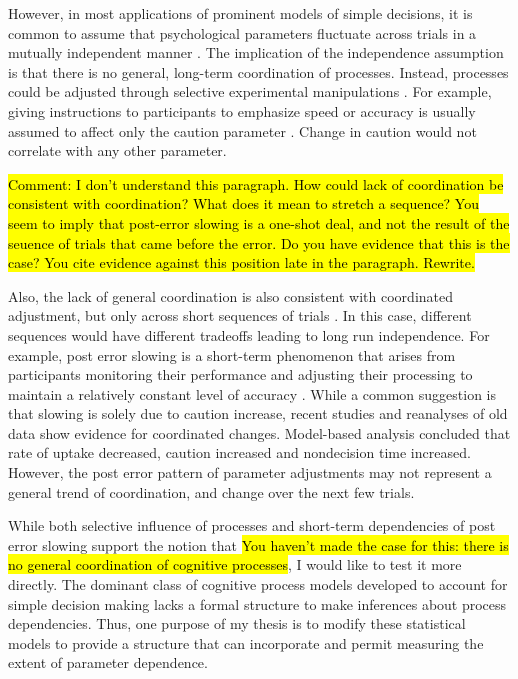 \documentclass[12pt]{article}
\newcommand{\trish}[1]{\textrm{\hl{#1}}}
\begin{document}
However, in most applications of prominent models of simple
decisions, it is common to assume that psychological parameters fluctuate
across trials in a mutually independent manner
\citep{RatTue2002,UshMcc2001,BroHea2008}. The implication of the
independence assumption is that there is no general, long-term coordination
of processes. Instead, processes could be adjusted  through selective experimental manipulations
\citep{VosAnd2004}. For example, giving instructions to participants to
emphasize speed or accuracy is usually assumed to affect only the
caution parameter
\citep{RatMck2008,Wag2009}. Change in
caution would not correlate with any other parameter.
    
\trish{Comment: I don't understand this paragraph. How could lack of coordination be
consistent with coordination?  What does it mean to stretch a sequence?
You seem to imply that post-error slowing is a one-shot deal, and not the
result of the seuence of trials that came before the error.  Do you have
evidence that this is the case?  You cite evidence against this position
late in the paragraph.  Rewrite.}

Also, the lack of general coordination
is also consistent with coordinated adjustment, but only across short sequences
of trials \citep{JonCur2013}. In this case, different sequences would have different tradeoffs
leading to long run independence. For example, post error slowing is a
short-term phenomenon that arises from participants monitoring their
performance and adjusting their processing to maintain a relatively
constant level of accuracy \citep{VanMal2004}. While a common suggestion is
that slowing is solely due to caution increase, recent studies \citep{DutFor2013, ZhaRow2014} and  reanalyses of old data \citep{VanTue2007,VanTue2011,RaeHea2014} show evidence for coordinated changes. Model-based analysis concluded that rate of uptake
decreased, caution increased and nondecision time increased. However, the
post error pattern of parameter adjustments may not represent a general
trend of coordination, and change over the next few trials.
    
While both selective influence of processes and short-term dependencies of
post error slowing support the notion that \trish{You haven't made the case
for this: there is no general coordination of cognitive processes}, I would
like to test it more directly. 
The dominant class of cognitive process  models developed to account for
simple decision making \citep{SmiRat2004} lacks a formal structure to make inferences
about process dependencies. Thus, one purpose
of my thesis is to modify these statistical models to provide a structure that can
incorporate and permit measuring the extent of parameter dependence.
    
\end{document}
